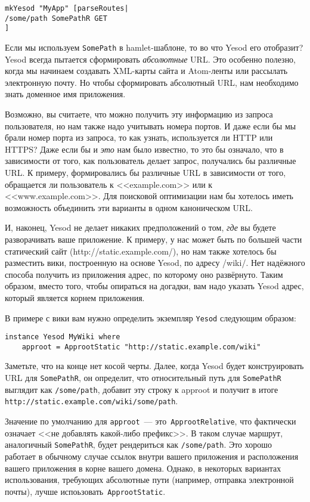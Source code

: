 \begin{lstlisting}
mkYesod "MyApp" [parseRoutes|
/some/path SomePathR GET
]
\end{lstlisting}

Если мы используем \lstinline!SomePath! в hamlet-шаблоне, то во что Yesod его
отобразит? Yesod всегда пытается сформировать \emph{абсолютные} URL. Это
особенно полезно, когда мы начинаем создавать XML-карты сайта и Atom-ленты или
рассылать электронную почту. Но чтобы сформировать абсолютный URL, нам
необходимо знать доменное имя приложения.

Возможно, вы считаете, что можно получить эту информацию из запроса
пользователя, но нам также надо учитывать номера портов. И даже если бы мы
брали номер порта из запроса, то как узнать, используется ли HTTP или HTTPS?
Даже если бы и \emph{это} нам было известно, то это бы означало, что в
зависимости от того, как пользователь делает запрос, получались бы различные
URL. К примеру, формировались бы различные URL в зависимости от того,
обращается ли пользователь к <<example.com>> или к <<www.example.com>>. Для
поисковой оптимизации нам бы хотелось иметь возможность объединить эти варианты
в одном каноническом URL.

И, наконец, Yesod не делает никаких предположений о том, \emph{где} вы будете
разворачивать ваше приложение. К примеру, у нас может быть по большей части
статический сайт (http://static.example.com/), но нам также хотелось бы
разместить вики, построенную на основе Yesod, по адресу /wiki/. Нет надёжного
способа получить из приложения адрес, по которому оно развёрнуто. Таким
образом, вместо того, чтобы опираться на догадки, вам надо указать Yesod адрес,
который является корнем приложения.

В примере с вики вам нужно определить экземпляр \lstinline!Yesod! следующим
образом:

\begin{lstlisting}
instance Yesod MyWiki where
    approot = ApprootStatic "http://static.example.com/wiki"
\end{lstlisting}

Заметьте, что на конце нет косой черты. Далее, когда Yesod будет конструировать
URL для \lstinline!SomePathR!, он определит, что относительный путь для
\lstinline!SomePathR! выглядит как \lstinline!/some/path!, добавит эту строку к
approot и получит в итоге \lstinline!http://static.example.com/wiki/some/path!.

Значение по умолчанию для \lstinline{approot}~---
это~\lstinline!ApprootRelative!, что фактически означает <<не добавлять
какой-либо префикс>>.  В таком случае маршрут, аналогичный
\lstinline!SomePathR!, будет рендериться как \lstinline!/some/path!. Это хорошо
работает в обычному случае ссылок внутри вашего приложения и расположения
вашего приложения в корне вашего домена. Однако, в некоторых вариантах
использования, требующих абсолютные пути (например, отправка электронной
почты), лучше испоьзовать~\lstinline!ApprootStatic!.

